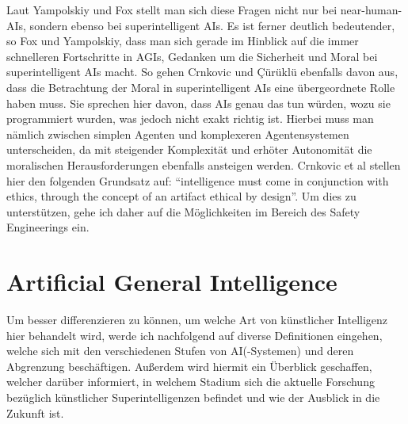             Laut Yampolskiy und Fox stellt man sich diese Fragen nicht nur bei near-human-AIs, sondern
            ebenso bei superintelligent AIs.\cite[p. 2]{yampolskiy2013safety} Es ist ferner deutlich
            bedeutender, so Fox und Yampolskiy, dass man sich gerade im Hinblick auf die immer schnelleren
            Fortschritte in AGIs, Gedanken um die Sicherheit und Moral bei superintelligent AIs macht.
            So gehen Crnkovic und {\c{C}}{\"u}r{\"u}kl{\"u} ebenfalls davon aus, dass die Betrachtung
            der Moral in superintelligent AIs eine übergeordnete Rolle haben muss.\cite[p. 1]{crnkovic2012robots}
            Sie sprechen hier davon, dass AIs genau das tun würden, wozu sie programmiert
            wurden, was jedoch nicht exakt richtig ist. Hierbei muss man nämlich zwischen simplen Agenten
            und komplexeren Agentensystemen unterscheiden, da mit steigender Komplexität und erhöter
            Autonomität die moralischen Herausforderungen ebenfalls ansteigen werden. Crnkovic et al
            stellen hier den folgenden Grundsatz auf: ``intelligence must come in conjunction with ethics,
            through the concept of an artifact ethical by design''. Um dies zu unterstützen, gehe ich daher
            auf die Möglichkeiten im Bereich des Safety Engineerings ein.

    \section{Artificial General Intelligence}
        Um besser differenzieren zu können, um welche Art von künstlicher Intelligenz hier behandelt
        wird, werde ich nachfolgend auf diverse Definitionen eingehen, welche sich mit den verschiedenen
        Stufen von AI(-Systemen) und deren Abgrenzung beschäftigen. Außerdem wird hiermit ein Überblick geschaffen,
        welcher darüber informiert, in welchem Stadium sich die aktuelle Forschung bezüglich künstlicher
        Superintelligenzen befindet und wie der Ausblick in die Zukunft ist.


